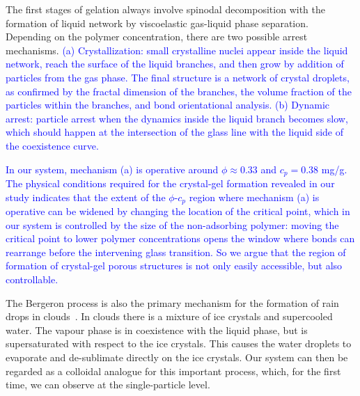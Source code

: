 \documentclass[preprint,amsmath,amssymb,superscriptaddress]{revtex4-1}
\begin{document}
The first stages of gelation always involve spinodal decomposition with the formation
of liquid network by viscoelastic gas-liquid phase separation. 
Depending on the polymer concentration, there are two possible arrest mechanisms. 
\textcolor{blue}{(a) Crystallization: small crystalline nuclei appear inside the liquid network, reach the surface 
 of the liquid branches, and then grow by addition of particles from the gas phase. The final structure is a network of crystal droplets,
 as confirmed by the fractal dimension of the branches, the volume fraction of the particles within the branches, and bond orientational analysis. 
(b) Dynamic arrest: particle arrest when the dynamics inside the liquid branch becomes slow, which should happen at the intersection of the  glass line with the liquid side of the coexistence curve.}

\textcolor{blue}{In our system, mechanism (a) is operative around $\phi\approx 0.33$ and $c_p=0.38$ mg/g. 
The physical conditions required for the crystal-gel formation revealed in our study indicates that the extent of the $\phi$-$c_p$ region where mechanism (a) is operative can be widened by changing the location of the critical point, which in our system is controlled by the size of the non-adsorbing polymer: moving the critical point to lower polymer concentrations opens the window where bonds can rearrange before the intervening glass transition. So we argue that the region of formation of crystal-gel porous structures is not only easily accessible, but also controllable.}


The Bergeron process is also the primary mechanism for the formation of rain drops in clouds~\cite{glickman2000glossary,morrison2012resilience}.
In clouds there is a mixture of ice crystals and supercooled water. The vapour phase is in coexistence with the liquid phase, but is supersaturated
with respect to the ice crystals. This causes the water droplets to evaporate and de-sublimate directly on the ice crystals. Our system can then
be regarded as a colloidal analogue for this important process, which, for the first time, we can observe at the single-particle level.  
\end{document}
